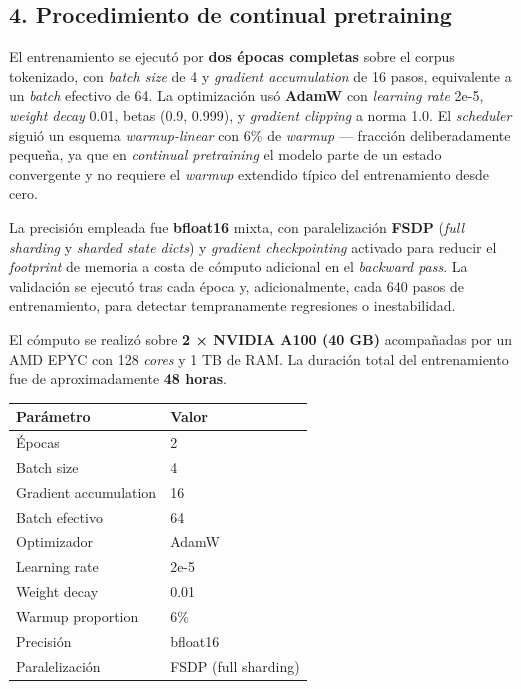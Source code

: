 \documentclass[
  spanish,
  letterpaper,
  DIV=11,
  numbers=noendperiod]{scrartcl}
\begin{document}
\subsection{4. Procedimiento de continual
pretraining}\label{procedimiento-de-continual-pretraining}

El entrenamiento se ejecutó por \textbf{dos épocas completas} sobre el
corpus tokenizado, con \emph{batch size} de 4 y \emph{gradient
accumulation} de 16 pasos, equivalente a un \emph{batch} efectivo de 64.
La optimización usó \textbf{AdamW} con \emph{learning rate} 2e-5,
\emph{weight decay} 0.01, betas (0.9, 0.999), y \emph{gradient clipping}
a norma 1.0. El \emph{scheduler} siguió un esquema \emph{warmup-linear}
con 6\% de \emph{warmup} --- fracción deliberadamente pequeña, ya que en
\emph{continual pretraining} el modelo parte de un estado convergente y
no requiere el \emph{warmup} extendido típico del entrenamiento desde
cero.

La precisión empleada fue \textbf{bfloat16} mixta, con paralelización
\textbf{FSDP} (\emph{full sharding} y \emph{sharded state dicts}) y
\emph{gradient checkpointing} activado para reducir el \emph{footprint}
de memoria a costa de cómputo adicional en el \emph{backward pass}. La
validación se ejecutó tras cada época y, adicionalmente, cada 640 pasos
de entrenamiento, para detectar tempranamente regresiones o
inestabilidad.

El cómputo se realizó sobre \textbf{2 × NVIDIA A100 (40 GB)} acompañadas
por un AMD EPYC con 128 \emph{cores} y 1 TB de RAM. La duración total
del entrenamiento fue de aproximadamente \textbf{48 horas}.

\begin{longtable}[]{@{}ll@{}}
\toprule\noalign{}
Parámetro & Valor \\
\midrule\noalign{}
\endhead
\bottomrule\noalign{}
\endlastfoot
Épocas & 2 \\
Batch size & 4 \\
Gradient accumulation & 16 \\
Batch efectivo & 64 \\
Optimizador & AdamW \\
Learning rate & 2e-5 \\
Weight decay & 0.01 \\
Warmup proportion & 6\% \\
Precisión & bfloat16 \\
Paralelización & FSDP (full sharding) \\
\end{longtable}
\end{document}
